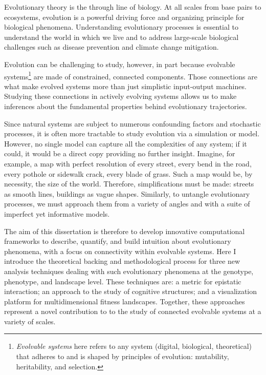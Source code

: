 Evolutionary theory is the through line of biology. At all scales from base pairs to ecosystems, evolution is a powerful driving force and organizing principle for biological phenomena. Understanding evolutionary processes is essential to understand the world in which we live and to address large-scale biological challenges such as disease prevention and climate change mitigation.

Evolution can be challenging to study, however, in part because evolvable systems\footnote{\textit{Evolvable systems }here refers to any system (digital, biological, theoretical) that adheres to and is shaped by principles of evolution: mutability, heritability, and selection.} are made of constrained, connected components. Those connections are what make evolved systems more than just simplistic input-output machines. Studying these connections in actively evolving systems allows us to make inferences about the fundamental properties behind evolutionary trajectories.

Since natural systems are subject to numerous confounding factors and stochastic processes, it is often more tractable to study evolution via a simulation or model. However, no single model can capture all the complexities of any system; if it could, it would be a direct copy providing no further insight. Imagine, for example, a map with perfect resolution of every street, every bend in the road, every pothole or sidewalk crack, every blade of grass. Such a map would be, by necessity, the size of the world. Therefore, simplifications must be made: streets as smooth lines, buildings as vague shapes. Similarly, to untangle evolutionary processes, we must approach them from a variety of angles and with a suite of imperfect yet informative models. 

The aim of this dissertation is therefore to develop innovative computational frameworks to describe, quantify, and build intuition about evolutionary phenomena, with a focus on connectivity within evolvable systems. Here I introduce the theoretical backing and methodological process for three new analysis techniques dealing with such evolutionary phenomena at the genotype, phenotype, and landscape level. These techniques are: a metric for epistatic interaction; an approach to the study of cognitive structures; and a visualization platform for multidimensional fitness landscapes. Together, these approaches represent a novel contribution to to the study of connected evolvable systems at a variety of scales.
